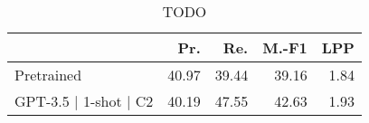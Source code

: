 \begin{table}[!ht]
\centering
\caption{TODO}
\label{tab:finetune-results}
\begin{tabular}{lrrrr}
\toprule
 & Pr. & Re. & M.-F1 & LPP \\
\midrule
Pretrained & 40.97 & 39.44 & 39.16 & 1.84 \\
GPT-3.5 | 1-shot | C2 & 40.19 & 47.55 & 42.63 & 1.93 \\
\bottomrule
\end{tabular}
\end{table}
